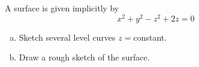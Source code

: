 \begin{question}[M253 2011D] %
A surface is given implicitly by
\begin{equation*}
x^2 + y^2 - z^2 + 2z = 0
\end{equation*}
\begin{enumerate}[(a)]
\item
Sketch several level curves $z = $constant.
\item
Draw a rough sketch of the surface. 
\end{enumerate}
\end{question}

%

